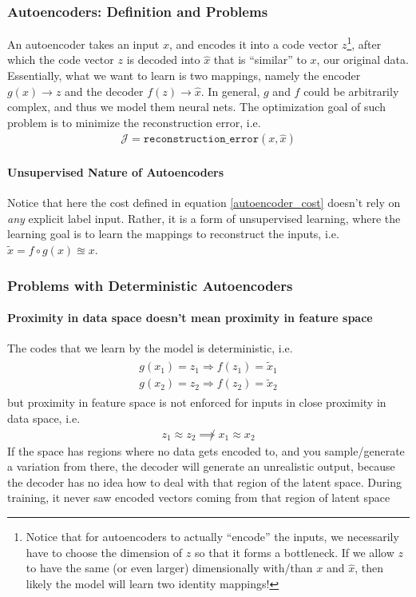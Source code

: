 \documentclass[11pt]{article}
\begin{document}
\subsubsection{Autoencoders: Definition and Problems}
An autoencoder takes an input $x$, and encodes it into a code vector $z$\footnote{Notice that for autoencoders to actually ``encode'' the inputs, we necessarily have to choose the dimension of $z$ so that it forms a bottleneck. If we allow $z$ to have the same (or even larger) dimensionally with/than $x$ and $\hat x$, then likely the model will learn two identity mappings!}, after which the code vector $z$ is decoded into $\hat{x}$ that is ``similar'' to $x$, our original data. Essentially, what we want to learn is two mappings, namely the encoder $g(x) \rightarrow z$ and the decoder $f(z) \rightarrow \hat{x}$. In general, $g$ and $f$ could be arbitrarily complex, and thus we model them neural nets. The optimization goal of such problem is to minimize the reconstruction error, i.e. 
\begin{align}
    \mathcal J = \texttt{reconstruction\_error} (x, \hat{x})\label{autoencoder_cost}
\end{align}
\paragraph{Unsupervised Nature of Autoencoders} Notice that here the cost defined in equation \ref{autoencoder_cost} doesn't rely on \textit{any} explicit label input. Rather, it is a form of unsupervised learning, where the learning goal is to learn the mappings to reconstruct the inputs, i.e. $\tilde x = f\circ g(x) \approxeq x$.

\subsubsection{Problems with Deterministic Autoencoders \label{deterministic_problems}} 
\paragraph{Proximity in data space doesn't mean proximity in feature space}
The codes that we learn by the model is deterministic, i.e.
\begin{align}
    \begin{array}{l}
    g\left(x_{1}\right)=z_{1} \Rightarrow f\left(z_{1}\right)=\tilde{x}_{1} \\
    g\left(x_{2}\right)=z_{2} \Rightarrow f\left(z_{2}\right)=\tilde{x}_{2}
    \end{array}
\end{align}
but proximity in feature space is not enforced for inputs in close proximity in data space, i.e.
\begin{align}
    z_{1} \approx z_{2} \not \implies x_{1} \approx x_{2}
\end{align}
If the space has regions where no data gets encoded to, and you sample/generate a variation from there, the decoder will generate an unrealistic output, because the decoder has no idea how to deal with that region of the latent space. During training, it never saw encoded vectors coming from that region of latent space
\end{document}
